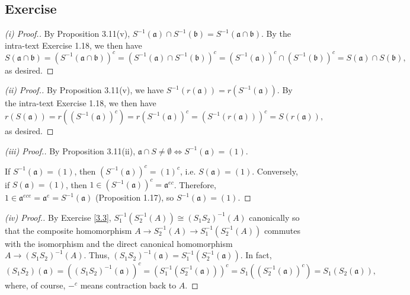 \subsection{Exercise}\label{4.12}

\begin{proof}[(i) Proof.]
By Proposition 3.11(v), $S^{-1}(\mathfrak{a}) \cap S^{-1}(\mathfrak{b}) = S^{-1}(\mathfrak{a} \cap \mathfrak{b})$. By the intra-text Exercise 1.18, we then have
$$S(\mathfrak{a} \cap \mathfrak{b}) = (S^{-1}(\mathfrak{a} \cap \mathfrak{b}))^c = (S^{-1}(\mathfrak{a}) \cap S^{-1}(\mathfrak{b}))^c = 
(S^{-1}(\mathfrak{a}))^c \cap (S^{-1}(\mathfrak{b}))^c = S(\mathfrak{a}) \cap S(\mathfrak{b}),$$
as desired.
\end{proof}

\begin{proof}[(ii) Proof.]
By Proposition 3.11(v), we have $S^{-1}(r(\mathfrak{a})) = r(S^{-1}(\mathfrak{a}))$. By the intra-text Exercise 1.18, we then have
$$r(S(\mathfrak{a})) = r((S^{-1}(\mathfrak{a}))^c) = r(S^{-1}(\mathfrak{a}))^c = (S^{-1}(r(\mathfrak{a})))^c = S(r(\mathfrak{a})),$$
as desired.
\end{proof}

\begin{proof}[(iii) Proof.]
By Proposition 3.11(ii), $\mathfrak{a} \cap S \neq \emptyset \iff S^{-1}(\mathfrak{a}) = (1)$. 

If $S^{-1}(\mathfrak{a}) = (1)$, then $(S^{-1}(\mathfrak{a}))^c = (1)^c$, i.e. $S(\mathfrak{a}) = (1)$. Conversely, if $S(\mathfrak{a}) = (1)$, then 
$1 \in (S^{-1}(\mathfrak{a}))^c = \mathfrak{a}^{ec}$. Therefore, $1 \in \mathfrak{a}^{ece} = \mathfrak{a}^e = S^{-1}(\mathfrak{a})$ (Proposition 1.17),
so $S^{-1}(\mathfrak{a}) = (1)$.
\end{proof}

\begin{proof}[(iv) Proof.]
By Exercise \ref{3.3}, $S_1^{-1}(S_2^{-1}(A)) \cong (S_1S_2)^{-1}(A)$ canonically so that the composite homomorphism
$A \to S_2^{-1}(A) \to S_1^{-1}(S_2^{-1}(A))$ commutes with the isomorphism and the direct canonical homomorphism $A \to (S_1S_2)^{-1}(A)$.
Thus, $(S_1S_2)^{-1}(\mathfrak{a}) = S_1^{-1}(S_2^{-1}(\mathfrak{a}))$. In fact,
$$(S_1S_2)(\mathfrak{a}) = ((S_1S_2)^{-1}(\mathfrak{a}))^c = (S_1^{-1}(S_2^{-1}(\mathfrak{a})))^c = S_1((S_2^{-1}(\mathfrak{a}))^c) = S_1(S_2(\mathfrak{a})),$$
where, of course, $-^c$ means contraction back to $A$.
\end{proof}

